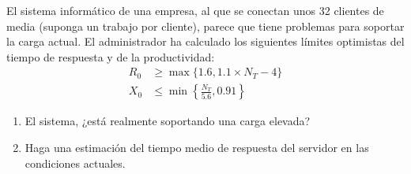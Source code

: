 \begin{comment}
\solucion
    \begin{enumerate}
        \item El servidor está cerca del equilibrio porque las demandas son parecidas: $D_1 = 0.09$ y $D_2 = D_3 = 0.08$ segundos/petición.
        \item La carga del servidor es elevada porque el cuello de botella está cerca de la saturación.
        \item El tiempo mínimo de respuesta es 0.25 segundos.
        \item No porque el cuello de botella es el procesador.
        \item El tiempo medio de respuesta es 10.3 segundos.
        \item No porque la disminución de la carga afecta a todo el sistema, no solamente al cuello de botella.
        \item La gráfica muestra una curva creciente con un punto de inflexión en torno a las 8 peticiones por segundo, donde el tiempo medio de respuesta comienza a aumentar rápidamente.
    \end{enumerate}
\end{comment}

\begin{ejercicio}\label{ej:5.23}
    El sistema informático de una empresa, al que se conectan unos 32 clientes de media (suponga un trabajo por cliente), parece que tiene problemas para soportar la carga actual. El administrador ha calculado los siguientes límites optimistas del tiempo de respuesta y de la productividad:
    \begin{align*}
        R_0 &\geq \max\{1.6, 1.1 \times N_T - 4\} \\
        X_0 &\leq \min\left\{\frac{N_T}{5.6}, 0.91\right\}
    \end{align*}
    \begin{enumerate}
        \item El sistema, ¿está realmente soportando una carga elevada?
        \item Haga una estimación del tiempo medio de respuesta del servidor en las condiciones actuales.
    \end{enumerate}
\end{ejercicio}
\begin{comment}
\solucion
    \begin{enumerate}
        \item La carga es elevada porque el punto teórico de saturación (knee point) está situado en torno a los 5 clientes y en el sistema hay 32 clientes conectados.
        \item El tiempo medio de respuesta del servidor estará situado ligeramente por encima de los 31.2 segundos (parte derecha del límite optimista).
    \end{enumerate}
\end{comment}


